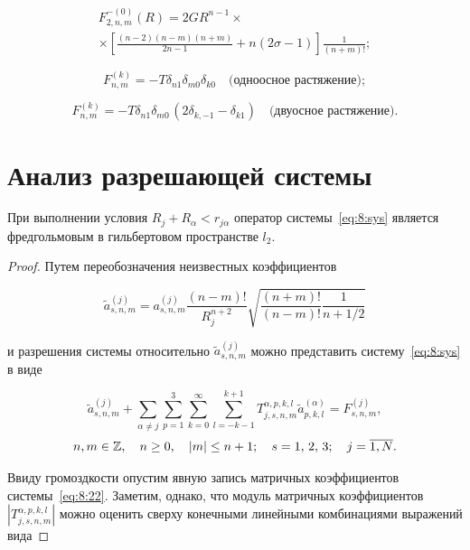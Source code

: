 \begin{russian}
\begin{multline}
F_{2,n,m}^{ - (0)}(R) = 2G{R^{n - 1}}\times \\
\times\left[ {\frac{{(n - 2)(n - m)(n + m)}}{{2n - 1}} + n(2\sigma  - 1)} \right]\frac{1}{{(n + m)!}};
\label{eq:8:18}
\end{multline}

\begin{equation}
F_{n,m}^{(k)} =  - T{\delta _{n1}}{\delta _{m0}}{\delta _{k0}}\quad\text{(одноосное растяжение)};
\label{eq:8:19}
\end{equation}

\begin{equation}
F_{n,m}^{(k)} =  - T{\delta _{n1}}{\delta _{m0\,}}(2{\delta _{k, - 1}} - {\delta _{k1}})\quad\text{(двуосное растяжение)}.
\label{eq:8:20}
\end{equation}

\section{Анализ разрешающей системы}

\begin{theorem}
При выполнении условия $R_j+R_\alpha<r_{j\alpha}$ оператор системы~\eqref{eq:8:sys} является фредгольмовым в гильбертовом пространстве $l_2$.
\end{theorem}

\begin{proof}
Путем переобозначения неизвестных коэффициентов

\begin{equation}
\tilde a_{s,n,m}^{(j)} = a_{s,n,m}^{(j)}\frac{{(n - m)!}}{{R_j^{n + 2}}}\sqrt {\frac{{(n + m)!}}{{(n - m)!}}\frac{1}{{n + 1/2}}}
\end{equation}

\noindent и разрешения системы относительно $\tilde a_{s,n,m}^{(j)}$ можно представить систему~\eqref{eq:8:sys} в виде

\begin{equation}
\tilde a_{s,n,m}^{(j)} + \sum\limits_{\alpha\neq j}\sum\limits_{p = 1}^3 {\sum\limits_{k = 0}^\infty  {\sum\limits_{l=-k-1}^{k+1}{T_{j,s,n,m}^{\alpha,p,k,l}}}}\tilde a_{p,k,l}^{(\alpha)} = F_{s,n,m}^{(j)},
\label{eq:8:22}
\end{equation}
$$
n,m \in\mathbb{Z} ,\quad n \ge 0,\quad |m| \le n + 1;\quad s = 1,{\mkern 1mu} {\kern 1pt} 2,{\mkern 1mu} {\kern 1pt} 3;\quad j = \overline {1,N}.
$$

Ввиду громоздкости опустим явную запись матричных коэффициентов системы~\eqref{eq:8:22}. Заметим, однако, что модуль матричных коэффициентов $\left|T_{j,s,n,m}^{\alpha,p,k,l}\right|$ можно оценить сверху конечными линейными комбинациями выражений вида


\end{proof}
\end{russian}
